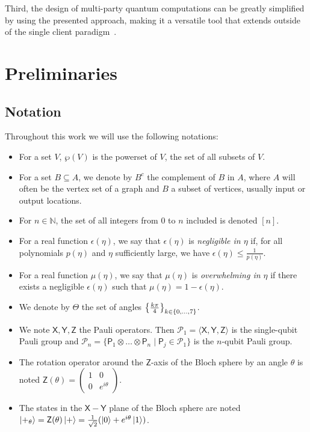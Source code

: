 \documentclass[12pt]{iopart}
\newcommand{\cptp}[1]{\mathsf{#1}} \newcommand{\pd}[1]{\mathcal{#1}}  \newcommand{\sch}[1]{\bm{#1}}
\newcommand{\X}{\cptp{X}}
\newcommand{\Z}{\cptp{Z}}
\newcommand{\Y}{\cptp{Y}}
\renewcommand{\1}{\mathds{1}}
\begin{document}
Third, the design of multi-party quantum computations can be greatly simplified by using the presented approach, making it a versatile tool that extends outside of the single client paradigm~\cite{KKLM+23:quantum}.
   
\section{Preliminaries}
\label{sec:prelims}
\subsection{Notation}
Throughout this work we will use the following notations:
\begin{itemize}
  \item For a set $V$, $\wp(V)$ is the powerset of $V$, the set of all subsets of $V$.
  \item For a set $B \subseteq A$, we denote by $B^c$ the complement of $B$ in $A$, where $A$ will often be the vertex set of a graph and $B$ a subset of vertices, usually input or output locations.
  \item For $n\in \mathbb N$, the set of all integers from $0$ to $n$ included is denoted $[n]$.
  \item For a real function $\epsilon(\eta)$, we say that $\epsilon(\eta)$  is \emph{negligible in $\eta$} if, for all polynomials $p(\eta)$ and $\eta$ sufficiently large, we have $\epsilon(\eta) \leq \frac{1}{p(\eta)}$.
  \item For a real function $\mu(\eta)$, we say that $\mu(\eta)$ is \emph{overwhelming in $\eta$} if there exists a negligible $\epsilon(\eta)$ such that $\mu(\eta) = 1 - \epsilon(\eta)$.  
  \item We denote by $\Theta$ the set of angles $\qty{\frac{k\pi}{4}}_{k \in \qty{0, \ldots, 7}}$.
  \item We note $\X, \Y, \Z$ the Pauli operators. Then $\mathcal{P}_1 = \langle \X, \Y, \Z \rangle$ is the single-qubit Pauli group and $\mathcal{P}_n = \{\cptp P_1 \otimes \ldots \otimes \cptp P_n \mid \cptp P_j \in \mathcal{P}_1\}$ is the $n$-qubit Pauli group.
  \item The rotation operator around the $\Z$-axis of the Bloch sphere by an angle $\theta$ is noted $\Z({\theta}) = \begin{pmatrix} 1 & 0 \\ 0 & e^{i\theta} \end{pmatrix}$.
  \item The states in the $\X - \Y$ plane of the Bloch sphere are noted $\ket{+_{\theta}} = \Z(\theta)\ket{+} = \frac{1}{\sqrt{2}}(\ket{0} + e^{i\theta}\ket{1})$.

\end{itemize}
\end{document}
